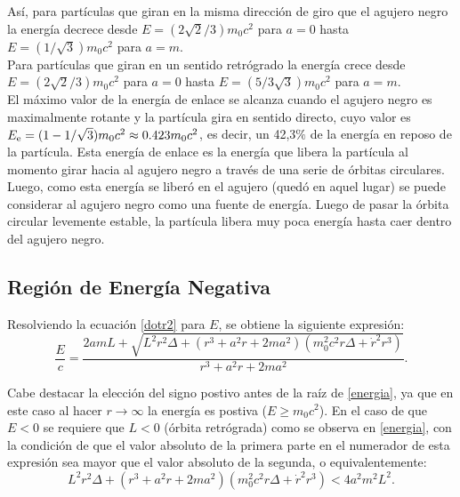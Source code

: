 As\'i, para part\'iculas que giran en la misma direcci\'on de giro que el agujero negro la energ\'ia decrece desde $E=(2\sqrt{2}/3)m_0c^2$ para $a=0$ hasta $E=(1/\sqrt{3})m_0c^2$ para $a=m$.\\

Para part\'iculas que giran en un sentido retr\'ogrado la energ\'ia crece desde $E=(2\sqrt{2}/3)m_0c^2$ para $a=0$ hasta $E=(5/3\sqrt{3})m_0c^2$ para $a=m$.\\

El m\'aximo valor de la energ\'ia de enlace se alcanza cuando el agujero negro es maximalmente rotante y la part\'icula gira en sentido directo, cuyo valor es $E_{\rm e}=(1-1/\sqrt{3})m_0c^2 \approx 0.423 m_0c^2$, es decir, un 42,3$\%$ de la energ\'ia en reposo de la part\'icula. Esta energ\'ia de enlace es la energ\'ia que libera la part\'icula al momento girar hacia al agujero negro a trav\'es de una serie de \'orbitas circulares. Luego, como esta energ\'ia se liber\'o en el agujero (qued\'o en aquel lugar) se puede considerar al agujero negro como una fuente de energ\'ia. Luego de pasar la \'orbita circular levemente estable, la part\'icula libera muy poca energ\'ia hasta caer dentro del agujero negro.\\

\subsection{Regi\'on de Energ\'ia Negativa}

Resolviendo la ecuaci\'on \eqref{dotr2} para $E$, se obtiene la siguiente expresi\'on:
\begin{equation}\label{energia}
\frac{E}{c}=\frac{2amL+\sqrt{L^2r^2\Delta+\left(r^3+a^2r+2ma^2\right)\left(m_0^2c^2r\Delta+\dot{r}^2r^3\right)}}{r^3+a^2r+2ma^2}.
\end{equation}

Cabe destacar la elecci\'on del signo postivo antes de la ra\'iz de \eqref{energia}, ya que en este caso al hacer $r\rightarrow \infty$ la energ\'ia es postiva ($E \geq m_0c^2$). En el caso de que $E<0$ se requiere que $L<0$ (\'orbita retr\'ograda) como se observa en \eqref{energia}, con la condici\'on de que el valor absoluto de la primera parte en el numerador de esta expresi\'on sea mayor que el valor absoluto de la segunda, o equivalentemente:
\begin{equation}\label{desigualdad}
L^2r^2\Delta+\left(r^3+a^2r+2ma^2\right)\left(m_0^2c^2r\Delta+\dot{r}^2r^3\right) < 4a^2m^2L^2.
\end{equation}

